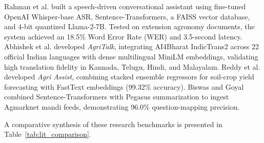 Rahman et al. \cite{Rahman2025} built a speech-driven conversational assistant using fine-tuned OpenAI Whisper-base ASR, Sentence-Transformers, a FAISS vector database, and 4-bit quantized Llama-2-7B. Tested on extension agronomy documents, the system achieved an 18.5\% Word Error Rate (WER) and 3.5-second latency. Abhishek et al. \cite{Abhishek2025} developed \textit{AgriTalk}, integrating AI4Bharat IndicTrans2 across 22 official Indian languages with dense multilingual MiniLM embeddings, validating high translation fidelity in Kannada, Telugu, Hindi, and Malayalam. Reddy et al. \cite{Reddy2025} developed \textit{Agri Assist}, combining stacked ensemble regressors for soil-crop yield forecasting with FastText embeddings (99.32\% accuracy). Biswas and Goyal \cite{Biswas2023} combined Sentence-Transformers with Pegasus summarization to ingest Agmarknet mandi feeds, demonstrating 96.0\% question-mapping precision.

A comparative synthesis of these research benchmarks is presented in Table~\ref{tab:lit_comparison}.

